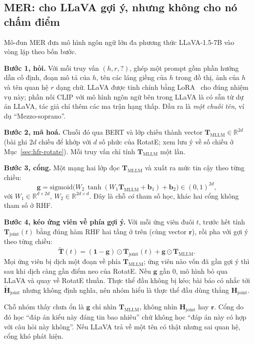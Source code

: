 \documentclass[conference,a4paper]{IEEEtran}
\newcommand{\Hj}{\mathbf{H}_{\mathrm{joint}}}
\newcommand{\Tj}{\mathbf{T}_{\mathrm{joint}}}
\newcommand{\Tm}{\mathbf{T}_{\mathrm{MLLM}}}
\newcommand{\Tt}{\tilde{\mathbf{T}}}
\begin{document}
\subsection{MER: cho LLaVA gợi ý, nhưng không cho nó chấm điểm}
\label{sec:hfr-mer}

Mô-đun MER đưa mô hình ngôn ngữ lớn đa phương thức LLaVA-1.5-7B vào vòng lặp theo bốn bước.

\textbf{Bước 1, hỏi.} Với mỗi truy vấn $(h, r, ?)$, ghép một prompt gồm phần hướng dẫn cố định, đoạn mô tả của $h$, tên các láng giềng của $h$ trong đồ thị, ảnh của $h$ và tên quan hệ $r$ dạng chữ. LLaVA được tinh chỉnh bằng LoRA~\cite{lora} cho đúng nhiệm vụ này; phần nối CLIP với mô hình ngôn ngữ bên trong LLaVA là có sẵn từ dự án LLaVA, tác giả chỉ thêm các ma trận hạng thấp. Đầu ra là \emph{một chuỗi tên}, ví dụ ``Mezzo-soprano''.

\textbf{Bước 2, mã hoá.} Chuỗi đó qua BERT và lớp chiếu thành vector $\Tm \in \mathbb{R}^{2d}$ (bài ghi $2d$ chiều để khớp với $d$ số phức của RotatE; xem lưu ý về số chiều ở Mục~\ref{sec:hfr-rotate}). Mỗi truy vấn chỉ tính $\Tm$ một lần.

\textbf{Bước 3, cổng.} Một mạng hai lớp đọc $\Tm$ và xuất ra mức tin cậy theo từng chiều:
\begin{equation}
\mathbf{g} = \mathrm{sigmoid}\big(W_2\,\tanh(W_1 \Tm + \mathbf{b}_1) + \mathbf{b}_2\big) \in (0,1)^{2d},
\label{eq:gate}
\end{equation}
với $W_1 \in \mathbb{R}^{d \times 2d}$, $W_2 \in \mathbb{R}^{2d \times d}$. Đây là chỗ \emph{có} tham số học, khác hai cổng không tham số ở RHF.

\textbf{Bước 4, kéo ứng viên về phía gợi ý.} Với mỗi ứng viên đuôi $t$, trước hết tính $\Tj(t)$ bằng đúng hàm RHF hai tầng ở trên (cùng vector $\mathbf{r}$), rồi pha với gợi ý theo từng chiều:
\begin{equation}
\Tt(t) = (\mathbf{1} - \mathbf{g}) \odot \Tj(t) + \mathbf{g} \odot \Tm .
\label{eq:interp}
\end{equation}
Mọi ứng viên bị dịch một đoạn về phía $\Tm$; ứng viên nào vốn đã gần gợi ý thì sau khi dịch càng gần điểm neo của RotatE. Nếu $\mathbf{g}$ gần 0, mô hình bỏ qua LLaVA và quay về RotatE thuần. Thực thể đầu không bị kéo; bài báo có nhắc tới $\tilde{\mathbf{H}}_{\mathrm{joint}}$ nhưng không định nghĩa, nên nhóm hiểu là thực thể đầu dùng thẳng $\Hj$.

Chỗ nhóm thấy chưa ổn là $\mathbf{g}$ chỉ nhìn $\Tm$, không nhìn $\Hj$ hay $\mathbf{r}$. Cổng do đó học ``đáp án kiểu này đáng tin bao nhiêu'' chứ không học ``đáp án này có hợp với câu hỏi này không''. Nếu LLaVA trả về một tên có thật nhưng sai quan hệ, cổng khó phát hiện.
\end{document}

